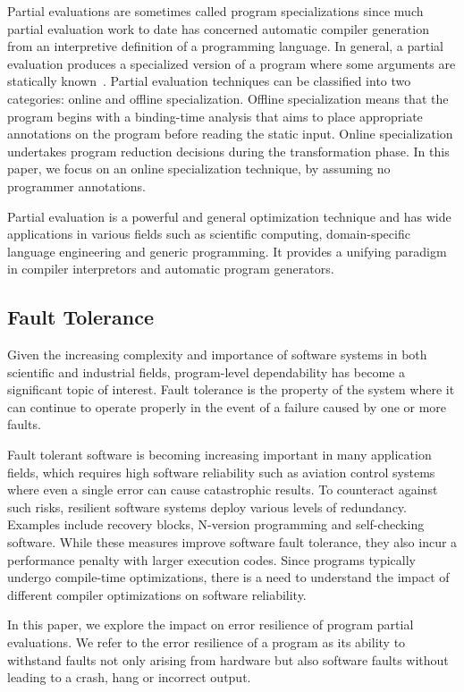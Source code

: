 Partial evaluations are sometimes called program specializations since much partial evaluation work to date has concerned automatic compiler generation from an interpretive definition of a programming language.
In general, a partial evaluation produces a specialized version of a program where some arguments are statically known~\cite{Jones1996}. 
Partial evaluation techniques can be classified into two categories: online and offline specialization.
Offline specialization means that the program begins with a binding-time analysis that aims to place appropriate annotations on the program before reading the static input.
Online specialization undertakes program reduction decisions during the transformation phase. In this paper, we focus on an online specialization technique, by assuming no programmer annotations. 

Partial evaluation is a powerful and general optimization technique and has wide applications in various fields such as scientific computing, domain-specific language engineering and generic programming.
It provides a unifying paradigm in compiler interpretors and automatic program generators.

\subsection{Fault Tolerance}
Given the increasing complexity and importance of software systems in both scientific and industrial fields, program-level dependability has become a significant topic of interest.
Fault tolerance is the property of the system where it can continue to operate properly in the event of a failure caused by one or more faults.

Fault tolerant software is becoming increasing important in many application fields, which requires high software reliability such as aviation control systems where even a single error can cause catastrophic results.
To counteract against such risks, resilient software systems deploy various levels of redundancy.
Examples include recovery blocks, N-version programming and self-checking software.
While these measures improve software fault tolerance, they also incur a performance penalty with larger execution codes.
Since programs typically undergo compile-time optimizations, there is a need to understand the impact of different compiler optimizations on software reliability.

In this paper, we explore the impact on error resilience of program partial evaluations. We refer to the error resilience of a program as its ability to withstand faults not only arising from hardware but also software faults without leading to a crash, hang or incorrect output. 

